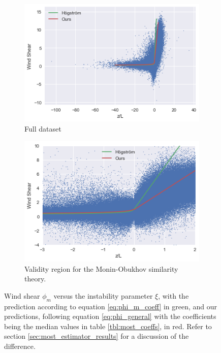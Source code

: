 \documentclass[12pt]{book}
\begin{document}
\begin{figure}
    \centering
    \begin{subfigure}[t]{0.48\textwidth}
        \centering
        \includegraphics[width=\textwidth]{images/most_full}
        \caption{Full dataset}
        \label{fig:most_full}
    \end{subfigure}
    \hfill
    \begin{subfigure}[t]{0.48\textwidth}
        \centering
        \includegraphics[width=\textwidth]{images/most_zoom}
        \caption{Validity region for the Monin-Obukhov similarity theory.}
        \label{fig:most_zoom}
    \end{subfigure}
    \caption{Wind shear $\phi_m$ versus the instability parameter $\xi$, with the prediction according to equation \ref{eq:phi_m_coeff} in green, and our predictions, following equation \ref{eq:phi_general} with the coefficients being the median values in table \ref{tbl:most_coeffs}, in red. Refer to section \ref{sec:most_estimator_results} for a discussion of the difference.}
	\label{fig:most_scatter}
\end{figure}
\end{document}
